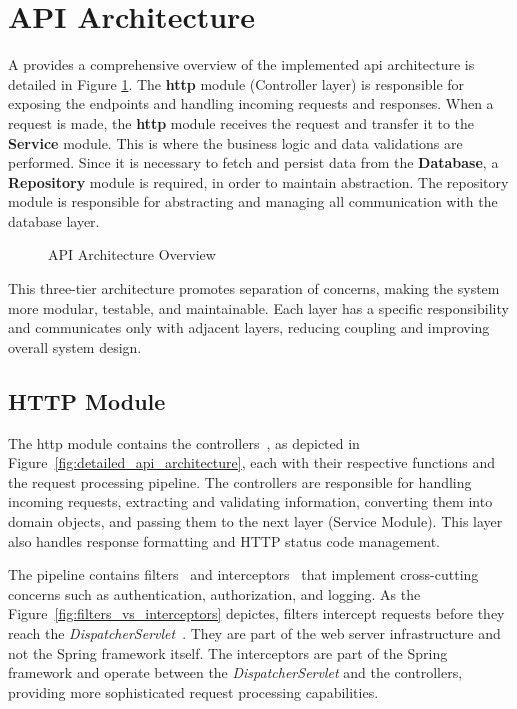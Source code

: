 \section{API Architecture}

A provides a comprehensive overview of the implemented \acs{api} architecture is detailed in Figure \ref{fig:api_architecture}. The \textbf{\ac{http}} module (Controller layer) is responsible for exposing the endpoints and handling incoming requests and responses. When a request is made, the \textbf{\acs{http}} module receives the request and transfer it to the \textbf{Service} module. This is where the business logic and data validations are performed. Since it is necessary to fetch and persist data from the \textbf{Database}, a \textbf{Repository} module is required, in order to maintain abstraction. The repository module is responsible for abstracting and managing all communication with the database layer.

\begin{figure}[H]
    \centering
    
    \caption{API Architecture Overview}
    \label{fig:api_architecture}
\end{figure}

This three-tier architecture promotes separation of concerns, making the system more modular, testable, and maintainable. Each layer has a specific responsibility and communicates only with adjacent layers, reducing coupling and improving overall system design.

\subsection{HTTP Module}
The \acs{http} module contains the controllers~\cite{controller}, as depicted in Figure~\ref{fig:detailed_api_architecture}, each with their respective functions and the request processing pipeline. The controllers are responsible for handling incoming requests, extracting and validating information, converting them into domain objects, and passing them to the next layer (Service Module). This layer also handles response formatting and HTTP status code management.

The pipeline contains filters~\cite{filter} and interceptors~\cite{interceptor} that implement cross-cutting concerns such as authentication, authorization, and logging. As the Figure~\ref{fig:filters_vs_interceptors} depictes, filters intercept requests before they reach the \textit{DispatcherServlet}~\cite{dispatcher-servlet}. They are part of the web server infrastructure and not the Spring framework itself. The interceptors are part of the Spring framework and operate between the \textit{DispatcherServlet} and the controllers, providing more sophisticated request processing capabilities.

